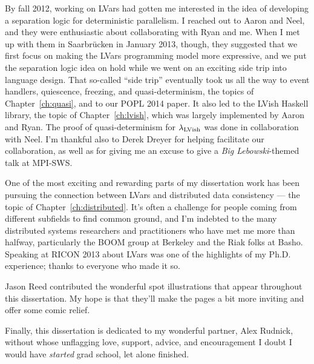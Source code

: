 By fall 2012, working on LVars had gotten me interested in the idea of developing a separation logic for deterministic parallelism.  I reached out to Aaron and Neel, and they were enthusiastic about collaborating with Ryan and me.  When I met up with them in Saarbr{\"u}cken in January 2013, though, they suggested that we first focus on making the LVars programming model more expressive, and we put the separation logic idea on hold while we went on an exciting side trip into language design.  That so-called ``side trip'' eventually took us all the way to event handlers, quiescence, freezing, and quasi-determinism, the topics of Chapter~\ref{ch:quasi}, and to our POPL 2014 paper.  It also led to the LVish Haskell library, the topic of Chapter~\ref{ch:lvish}, which was largely implemented by Aaron and Ryan.  The proof of quasi-determinism for $\lambda_{\textrm{LVish}}$ was done in collaboration with Neel.  I'm thankful also to Derek Dreyer for helping facilitate our collaboration, as well as for giving me an excuse to give a \emph{Big Lebowski}-themed talk at MPI-SWS.

One of the most exciting and rewarding parts of my dissertation work has been pursuing the connection between LVars and distributed data consistency --- the topic of Chapter~\ref{ch:distributed}.  It's often a challenge for people coming from different subfields to find common ground, and I'm indebted to the many distributed systems researchers and practitioners who have met me more than halfway, particularly the BOOM group at Berkeley and the Riak folks at Basho.  Speaking  at RICON 2013 about LVars was one of the highlights of my Ph.D. experience; thanks to everyone who made it so.

Jason Reed contributed the wonderful spot illustrations that appear throughout this dissertation.  My hope is that they'll make the pages a bit more inviting and offer some comic relief.

Finally, this dissertation is dedicated to my wonderful partner, Alex Rudnick, without whose unflagging love, support, advice, and encouragement I doubt I would have \emph{started} grad school, let alone finished.
